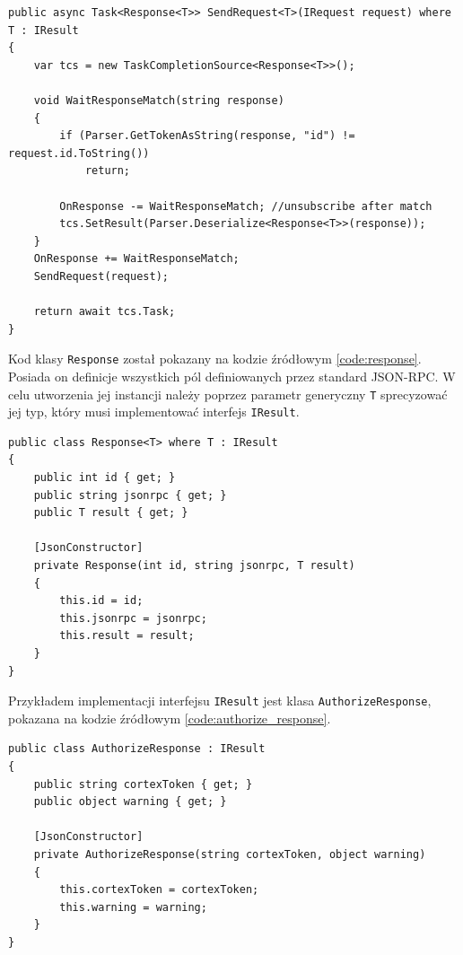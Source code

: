 \documentclass[skorowidz,skroty]{dyplomWEZUT}
\begin{document}
\begin{lstlisting}[language={[Sharp]C}]
public async Task<Response<T>> SendRequest<T>(IRequest request) where T : IResult
{
    var tcs = new TaskCompletionSource<Response<T>>();

    void WaitResponseMatch(string response)
    {
        if (Parser.GetTokenAsString(response, "id") != request.id.ToString())
            return;

        OnResponse -= WaitResponseMatch; //unsubscribe after match
        tcs.SetResult(Parser.Deserialize<Response<T>>(response));
    }
    OnResponse += WaitResponseMatch;
    SendRequest(request);

    return await tcs.Task;
}
\end{lstlisting}

Kod klasy \lstinline[language={[Sharp]C}]{Response} został pokazany na kodzie źródłowym \ref{code:response}. Posiada on definicje wszystkich pól definiowanych przez standard JSON-RPC. W celu utworzenia jej instancji należy poprzez parametr generyczny \lstinline[language={[Sharp]C}]{T} sprecyzować jej typ, który musi implementować interfejs \lstinline[language={[Sharp]C}]{IResult}.

\begin{lstlisting}[language={[Sharp]C}]
public class Response<T> where T : IResult
{
    public int id { get; }
    public string jsonrpc { get; }
    public T result { get; }

    [JsonConstructor]
    private Response(int id, string jsonrpc, T result)
    {
        this.id = id;
        this.jsonrpc = jsonrpc;
        this.result = result;
    }
}
\end{lstlisting}

Przykładem implementacji interfejsu \lstinline[language={[Sharp]C}]{IResult} jest klasa \lstinline[language={[Sharp]C}]{AuthorizeResponse}, pokazana na kodzie źródłowym \ref{code:authorize_response}.

\begin{lstlisting}[language={[Sharp]C}]
public class AuthorizeResponse : IResult
{
    public string cortexToken { get; }
    public object warning { get; }

    [JsonConstructor]
    private AuthorizeResponse(string cortexToken, object warning)
    {
        this.cortexToken = cortexToken;
        this.warning = warning;
    }
}
\end{lstlisting}
\end{document}
